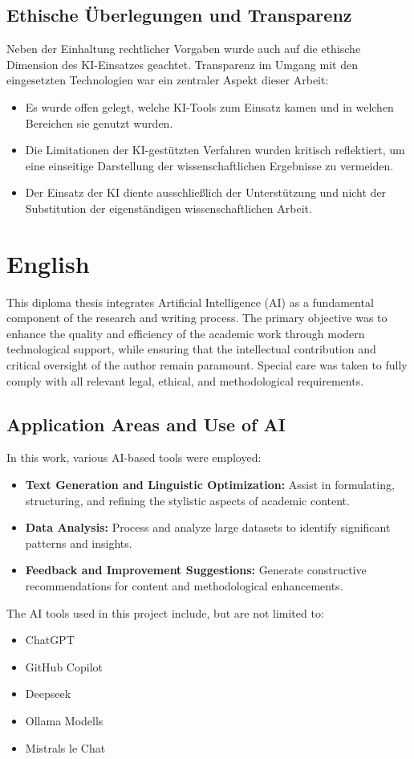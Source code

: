 \subsection*{Ethische Überlegungen und Transparenz}
Neben der Einhaltung rechtlicher Vorgaben wurde auch auf die ethische Dimension des KI-Einsatzes geachtet. Transparenz im Umgang mit den eingesetzten Technologien war ein zentraler Aspekt dieser Arbeit:
\begin{itemize}
    \item Es wurde offen gelegt, welche KI-Tools zum Einsatz kamen und in welchen Bereichen sie genutzt wurden.
    \item Die Limitationen der KI-gestützten Verfahren wurden kritisch reflektiert, um eine einseitige Darstellung der wissenschaftlichen Ergebnisse zu vermeiden.
    \item Der Einsatz der KI diente ausschließlich der Unterstützung und nicht der Substitution der eigenständigen wissenschaftlichen Arbeit.
\end{itemize}


\section*{English}
This diploma thesis integrates Artificial Intelligence (AI) as a fundamental component of the research and writing process. The primary objective was to enhance the quality and efficiency of the academic work through modern technological support, while ensuring that the intellectual contribution and critical oversight of the author remain paramount. Special care was taken to fully comply with all relevant legal, ethical, and methodological requirements.

\subsection*{Application Areas and Use of AI}
In this work, various AI-based tools were employed:
\begin{itemize}
    \item \textbf{Text Generation and Linguistic Optimization:} Assist in formulating, structuring, and refining the stylistic aspects of academic content.
    \item \textbf{Data Analysis:} Process and analyze large datasets to identify significant patterns and insights.
    \item \textbf{Feedback and Improvement Suggestions:} Generate constructive recommendations for content and methodological enhancements.
\end{itemize}
The AI tools used in this project include, but are not limited to:
\begin{itemize}
    \item ChatGPT
    \item GitHub Copilot
    \item Deepseek
    \item Ollama Modells
    \item Mistrals le Chat
\end{itemize}

